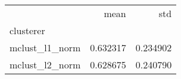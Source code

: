 \begin{tabular}{lrr}
\toprule
{} &      mean &       std \\
clusterer      &           &           \\
\midrule
mclust\_l1\_norm &  0.632317 &  0.234902 \\
mclust\_l2\_norm &  0.628675 &  0.240790 \\
\bottomrule
\end{tabular}

